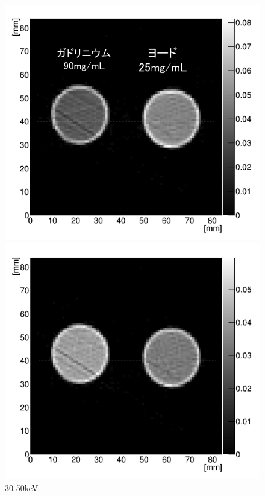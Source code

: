 \begin{figure}[H]
 \begin{minipage}{0.5\hsize}
  \begin{center}
 \includegraphics[bb=0.000000 0.000000 294.695638 271.177583,width=1\hsize]{image2/chapter5/hanten_30-50.png} 
  \end{center}
  \vspace{-1cm}
  \caption*{30-50keV}
 \end{minipage}
 \begin{minipage}{0.5\hsize}
  \begin{center}
 \includegraphics[bb=0.000000 0.000000 294.695638 272.137503,width=1\hsize]{image2/chapter5/hanten_50-70.png} 

\end{center}
\end{minipage}
\end{figure}
